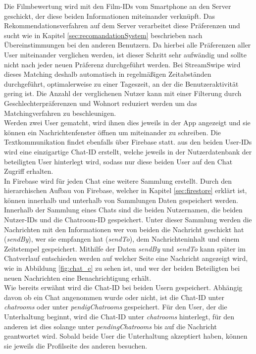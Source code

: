 Die Filmbewertung wird mit den Film-IDs vom Smartphone an den Server geschickt, der diese beiden Informationen miteinander verknüpft. Das Rekommendationsverfahren auf dem Server verarbeitet diese Präferenzen und sucht wie in Kapitel \ref{sec:recomandationSystem} beschrieben nach Übereinstimmungen bei den anderen Benutzern. Da hierbei alle Präferenzen aller User miteinander verglichen werden, ist dieser Schritt sehr aufwändig und sollte nicht nach jeder neuen Präferenz durchgeführt werden. Bei StreamSwipe wird dieses Matching deshalb automatisch in regelmäßigen Zeitabständen durchgeführt, optimalerweise zu einer Tageszeit, an der die Benutzeraktivität gering ist. Die Anzahl der verglichenen Nutzer kann mit einer Filterung durch Geschlechterpräferenzen und Wohnort reduziert werden um das Matchingverfahren zu beschleunigen. \\
Werden zwei User gematcht, wird ihnen dies jeweils in der App angezeigt und sie können ein Nachrichtenfenster öffnen um miteinander zu schreiben. Die Textkommunikation findet ebenfalls über  Firebase statt. aus den beiden User-IDs wird eine einzigartige Chat-ID erstellt, welche jeweils in der Nutzerdatenbank der beteiligten User hinterlegt wird, sodass nur diese beiden User auf den Chat Zugriff erhalten.\\
In Firebase wird für jeden Chat eine weitere Sammlung erstellt. Durch den hierarchischen Aufbau von Firebase, welcher in Kapitel \ref{sec:firestore} erklärt ist, können innerhalb und unterhalb von Sammlungen Daten gespeichert werden. Innerhalb der Sammlung eines Chats sind die beiden Nutzernamen, die beiden Nutzer-IDs und die Chatroom-ID gespeichert. Unter dieser Sammlung werden die Nachrichten mit den Informationen wer von beiden die Nachricht geschickt hat (\textit{sendBy}), wer sie empfangen hat (\textit{sendTo}), dem Nachrichteninhalt und einem Zeitstempel gespeichert. Mithilfe der Daten \textit{sendBy} und \textit{sendTo} kann später im Chatverlauf entschieden werden auf welcher Seite eine Nachricht angezeigt wird, wie in Abbildung \ref{fig:chat_e} zu sehen ist, und wer der beiden Beteiligten bei neuen Nachrichten eine Benachrichtigung erhält.\\
Wie bereits erwähnt wird die Chat-ID bei beiden Usern gespeichert. Abhängig davon ob ein Chat angenommen wurde oder nicht, ist die Chat-ID unter \textit{chatrooms} oder unter \textit{pendigChatrooms} gespeichert. Für den User, der die Unterhaltung beginnt, wird die Chat-ID unter \textit{chatrooms} hinterlegt, für den anderen ist dies solange unter \textit{pendingChatrooms} bis auf die Nachricht geantwortet wird. Sobald beide User die Unterhaltung akzeptiert haben, können sie jeweils die Profilseite des anderen besuchen.


